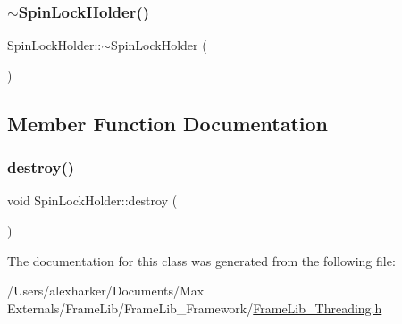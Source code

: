 \subsubsection{\texorpdfstring{$\sim$\+Spin\+Lock\+Holder()}{~SpinLockHolder()}}
{\footnotesize\ttfamily Spin\+Lock\+Holder\+::$\sim$\+Spin\+Lock\+Holder (\begin{DoxyParamCaption}{ }\end{DoxyParamCaption})\hspace{0.3cm}{\ttfamily [inline]}}



\subsection{Member Function Documentation}
\mbox{\label{class_spin_lock_holder_ac875a2a26da06fb075b5d3ea52acf104}} 
\subsubsection{\texorpdfstring{destroy()}{destroy()}}
{\footnotesize\ttfamily void Spin\+Lock\+Holder\+::destroy (\begin{DoxyParamCaption}{ }\end{DoxyParamCaption})\hspace{0.3cm}{\ttfamily [inline]}}



The documentation for this class was generated from the following file\+:\begin{DoxyCompactItemize}
\item 
/\+Users/alexharker/\+Documents/\+Max Externals/\+Frame\+Lib/\+Frame\+Lib\+\_\+\+Framework/\hyperlink{_frame_lib___threading_8h}{Frame\+Lib\+\_\+\+Threading.\+h}\end{DoxyCompactItemize}
